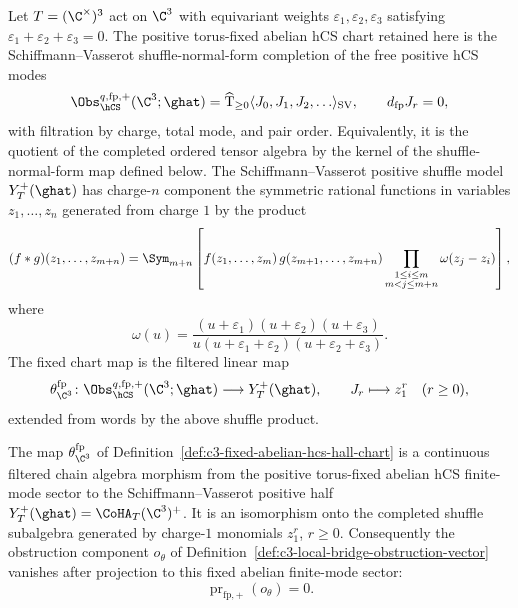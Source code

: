 \begin{definition}
\label{def:c3-fixed-abelian-hcs-hall-chart}
Let $T=(\C^\times)^3$ act on $\C^3$ with equivariant weights
$\varepsilon_1,\varepsilon_2,\varepsilon_3$ satisfying
$\varepsilon_1+\varepsilon_2+\varepsilon_3=0$. The positive
torus-fixed abelian hCS chart retained here is the
Schiffmann--Vasserot shuffle-normal-form completion of the free positive
hCS modes
\[
 \Obs_{\hCS}^{q,\mathrm{fp},+}(\C^3;\ghat)
 =
 \widehat{\mathrm T}_{\geq 0}\langle J_0,J_1,J_2,\ldots\rangle_{\mathrm{SV}},
 \qquad d_{\mathrm{fp}}J_r=0,
\]
with filtration by charge, total mode, and pair order. Equivalently,
it is the quotient of the completed ordered tensor algebra by the kernel
of the shuffle-normal-form map defined below. The
Schiffmann--Vasserot positive shuffle model
$Y_T^+(\ghat)$ has charge-$n$ component the symmetric rational
functions in variables $z_1,\ldots,z_n$ generated from charge $1$ by
the product
\[
 (f*g)(z_1,\ldots,z_{m+n})
 =
 \Sym_{m+n}
 \left[
 f(z_1,\ldots,z_m)\,
 g(z_{m+1},\ldots,z_{m+n})
 \prod_{\substack{1\leq i\leq m\\m<j\leq m+n}}
 \omega(z_j-z_i)
 \right],
\]
where
\[
 \omega(u)
 =
 \frac{(u+\varepsilon_1)(u+\varepsilon_2)(u+\varepsilon_3)}
 {u(u+\varepsilon_1+\varepsilon_2)(u+\varepsilon_2+\varepsilon_3)}.
\]
The fixed chart map is the filtered linear map
\[
 \theta_{\C^3}^{\mathrm{fp}}\colon
 \Obs_{\hCS}^{q,\mathrm{fp},+}(\C^3;\ghat)
 \longrightarrow
 Y_T^+(\ghat),
 \qquad
 J_r\longmapsto z_1^r\quad (r\geq 0),
\]
extended from words by the above shuffle product.
\end{definition}

\begin{theorem}
\label{thm:c3-fixed-abelian-chart-map}
The map $\theta_{\C^3}^{\mathrm{fp}}$ of
Definition~\ref{def:c3-fixed-abelian-hcs-hall-chart} is a continuous
filtered chain algebra morphism from the positive torus-fixed abelian
hCS finite-mode sector to the Schiffmann--Vasserot positive half
$Y_T^+(\ghat)=\CoHA_T(\C^3)^{+}$. It is an isomorphism onto the
completed shuffle subalgebra generated by charge-$1$ monomials
$z_1^r$, $r\geq 0$. Consequently the obstruction component
$o_{\theta}$ of Definition~\ref{def:c3-local-bridge-obstruction-vector}
vanishes after projection to this fixed abelian finite-mode sector:
\[
 \operatorname{pr}_{\mathrm{fp},+}(o_\theta)=0.
\]
\end{theorem}

